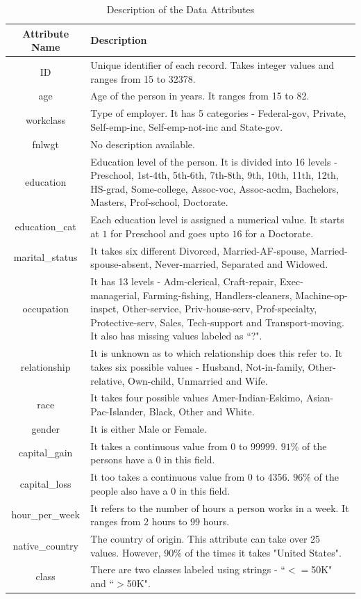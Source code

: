 \begin{table}[h]
\label{table:database-description}
\caption{Description of the Data Attributes}
\centering
	\begin{tabular}{| c | m{140 pt} |}
		\hline
		Attribute Name & Description\\
		\hline
		ID & Unique identifier of each record. Takes integer values and ranges from 15 to 32378.\\
		\hline
		age & Age of the person in years. It ranges from 15 to 82.\\
		\hline
		workclass & Type of employer. It has 5 categories - Federal-gov, Private, Self-emp-inc, Self-emp-not-inc and State-gov. \\
		\hline
		fnlwgt & No description available. \\
		\hline
		\hline
		education & Education level of the person. It is divided into 16 levels - Preschool, 1st-4th, 5th-6th, 7th-8th, 9th, 10th, 11th, 12th, HS-grad, Some-college, Assoc-voc, Assoc-acdm, Bachelors, Masters, Prof-school, Doctorate.\\
		education\_cat & Each education level is assigned a numerical value. It starts at $1$ for Preschool and goes upto $16$ for a Doctorate.\\
		\hline
		marital\_status & It takes six different Divorced, Married-AF-spouse, Married-spouse-absent, Never-married, Separated and Widowed.\\
		\hline
		occupation & It has 13 levels - Adm-clerical, Craft-repair, Exec-managerial, Farming-fishing, Handlers-cleaners, Machine-op-inspct, Other-service, Priv-house-serv, Prof-specialty, Protective-serv, Sales, Tech-support and Transport-moving. It also has missing values labeled as ``?".\\
		\hline
		relationship & It is unknown as to which relationship does this refer to. It takes six possible values - Husband, Not-in-family, Other-relative, Own-child, Unmarried and Wife.\\
		\hline
		race & It takes four possible values Amer-Indian-Eskimo, Asian-Pac-Islander, Black, Other and White. \\
		\hline
		gender & It is either Male or Female.\\
		\hline
		capital\_gain & It takes a continuous value from 0 to 99999. $91\%$ of the persons have a 0 in this field.\\
		\hline
		capital\_loss & It too takes a continuous value from 0 to 4356. $96\%$ of the people also have a 0 in this field. \\
		\hline
		hour\_per\_week & It refers to the number of hours a person works in a week. It ranges from 2 hours to 99 hours.\\
		\hline
		native\_country & The country of origin. This attribute can take over 25 values. However, 90\% of the times it takes "United States".\\
		\hline
		class & There are two classes labeled using strings - ``$<=$50K" and ``$>$50K".\\
		\hline
	\end{tabular}
\end{table}

